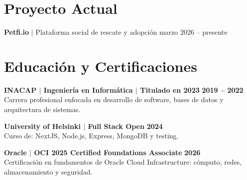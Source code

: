 

\resumeItemListEnd

\resumeSubHeadingListEnd

\section{Proyecto Actual}

\resumeSubHeadingListStart

\resumeProjectHeading
{\textbf{Petfi.io} $|$ Plataforma social de rescate y adopción}
{marzo 2026 -- presente}
\resumeItemListStart


\resumeItemListEnd

\resumeSubHeadingListEnd
\vspace{-6pt}

\section{Educación y Certificaciones}

\noindent\textbf{INACAP $|$ Ingeniería en Informática $|$ Titulado en 2023}
\hfill
\textbf{2019 -- 2022} \\
{\small Carrera profesional enfocada en desarrollo de software,
        bases de datos y
arquitectura de sistemas.}
\par\vspace{1pt}

\noindent\textbf{University of Helsinki $|$ Full Stack Open} \hfill
\textbf{2024} \\
{\small Curso de: NextJS, Node.js, Express, MongoDB y testing.}
\par\vspace{1pt}

\noindent\textbf{Oracle $|$ OCI 2025 Certified Foundations Associate} \hfill
\textbf{2026} \\
{\small Certificación en fundamentos de Oracle Cloud Infrastructure:
        cómputo, redes,
almacenamiento y seguridad.}

